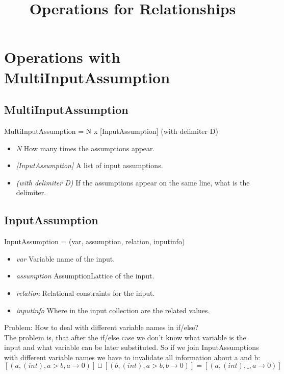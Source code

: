 \documentclass[11pt]{article}
\begin{document}
\title{Operations for Relationships}

\maketitle


\section{Operations with MultiInputAssumption}

\subsection{MultiInputAssumption}

MultiInputAssumption = N x [InputAssumption] (with delimiter D)
\begin{itemize}
  \item \textit{N} How many times the assumptions appear.
  \item \textit{[InputAssumption]} A list of input assumptions.
  \item \textit{(with delimiter D)} If the assumptions appear on the same line, what is the delimiter.
\end{itemize}

\subsection{InputAssumption}

InputAssumption = (var, assumption, relation, inputinfo)
\begin{itemize}
  \item \textit{var} Variable name of the input.
  \item \textit{assumption} AssumptionLattice of the input.
  \item \textit{relation} Relational constraints for the input.
  \item \textit{inputinfo} Where in the input collection are the related values.
\end{itemize}

Problem: How to deal with different variable names in if/else?\\
The problem is, that after the if/else case we don't know what variable is the input and what variable can be later substituted. So if we join InputAssumptions with different variable names we have to invalidate all information about a and b:\\
$[(a, (int), a > b, a \rightarrow 0)] \sqcup [(b, (int), a > b, b \rightarrow 0)] = [(a, (int), \_, a \rightarrow 0)]$
\end{document}
